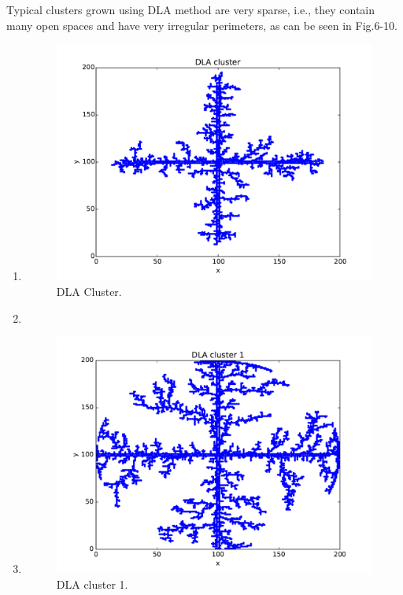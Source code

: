 \documentclass[aps,prl,preprint,superscriptaddress]{revtex4}
\begin{document}
Typical clusters grown using DLA method are very sparse, i.e., they contain many open spaces and have very irregular perimeters, as can be seen in Fig.6-10. 
\begin{enumerate}
\item
		\begin{figure}[H]
			\centering
			\includegraphics[width=1.0\textwidth]{dla.pdf}
			\caption{DLA Cluster.}
		\end{figure}
\item
\item
		\begin{figure}[H]
			\centering
			\includegraphics[width=1.0\textwidth]{dla_0.pdf}
			\caption{DLA cluster 1.}
		\end{figure}

\end{enumerate}
\end{document}
